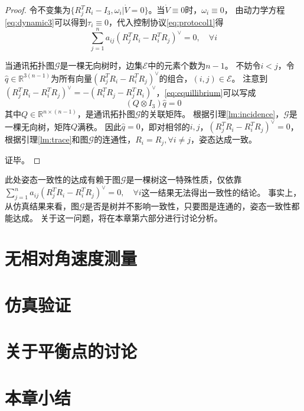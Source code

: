 \begin{theorem}
\begin{proof}
        令不变集为$\{R_j^TR_i-I_3,\omega_i|\dot V=0\}$。当$\dot V\equiv0$时，$\omega_i\equiv0$，
        由动力学方程\ref{eq:dynamic3}可以得到$\tau_i\equiv0$，代入控制协议\ref{eq:protocol1}得
        \begin{equation}
            \label{eq:equillibrium}
            \sum_{j=1}^na_{ij}(R_j^TR_i-R_i^TR_j)^\vee=0,\quad \forall i
        \end{equation}

        当通讯拓扑图$\mathcal{G}$是一棵无向树时，边集$\mathcal{E}$中的元素个数为$n-1$。
        不妨令$i<j$，令$\hat q\in\mathbb{R}^{3(n-1)}$为所有向量$(R_j^TR_i-R_i^TR_j)^\vee$的组合，$(i,j)\in\mathcal{E}$。
        注意到$(R_j^TR_i-R_i^TR_j)^\vee=-(R_i^TR_j-R_j^TR_i)^\vee$，\ref{eq:equillibrium}可以写成
        \begin{equation}
            (Q\otimes I_3)\hat q=0
        \end{equation}
        其中$Q\in\mathbb{R}^{n\times(n-1)}$，是通讯拓扑图$\mathcal{G}$的关联矩阵。
        根据引理\ref{lm:incidence}，$\mathcal{G}$是一棵无向树，矩阵$Q$满秩。
        因此$\hat q=0$，即对相邻的$i,j$，$(R_j^TR_i-R_i^TR_j)^\vee=0$，
        根据引理\ref{lm:trace}和图$\mathcal{G}$的连通性，$R_i=R_j,\forall i\not=j$，姿态达成一致。

        证毕。
    \end{proof}
\end{theorem}

此处姿态一致性的达成有赖于图$\mathcal{G}$是一棵树这一特殊性质，仅依靠$\sum_{j=1}^na_{ij}(R_j^TR_i-R_i^TR_j)^\vee=0,\quad \forall i$这一结果无法得出一致性的结论。
事实上，从仿真结果来看，图$\mathcal{G}$是否是树并不影响一致性，只要图是连通的，姿态一致性都能达成。
关于这一问题，将在本章第六部分进行讨论分析。


\section{无相对角速度测量}
\section{仿真验证}
\section{关于平衡点的讨论}
\section{本章小结}